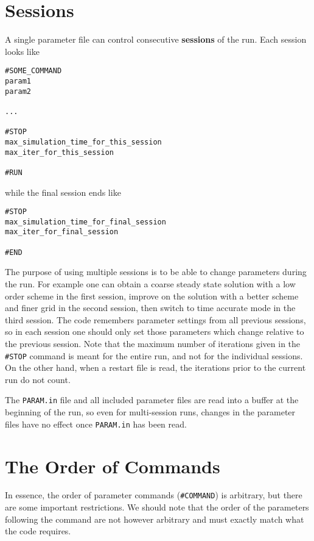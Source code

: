 \section{Sessions \label{section:sessions}}

A single parameter file can control consecutive {\bf sessions}
of the run. Each session looks like
\begin{verbatim}
#SOME_COMMAND
param1
param2

...

#STOP
max_simulation_time_for_this_session
max_iter_for_this_session

#RUN
\end{verbatim}
while the final session ends like
\begin{verbatim}
#STOP
max_simulation_time_for_final_session
max_iter_for_final_session

#END
\end{verbatim}
The purpose of using multiple sessions is to be able to change parameters 
during the run. For example one can obtain a coarse steady state solution
with a low order scheme in the first session, improve on the solution
with a better scheme and finer grid in the second session, then switch
to time accurate mode in the third session. The code remembers parameter
settings from all previous sessions, so in each session one should only
set those parameters which change relative to the previous session.
Note that the maximum number of iterations given in the {\tt \#STOP} command 
is meant for the entire run, and not for the individual sessions. 
On the other hand, when a restart file is read, the iterations prior to 
the current run do not count.

The {\tt PARAM.in} file and all included parameter files are read into 
a buffer 
at the beginning of the run, so even for multi-session runs, changes in
the parameter files have no effect once {\tt PARAM.in} has been read.

\section{The Order of Commands \label{section:order}}

In essence, the order of parameter commands ({\tt \#COMMAND}) is arbitrary, 
but there are some important restrictions.  We should note that the 
order of the parameters following the command are not however arbitrary 
and must exactly match what the code requires.  

